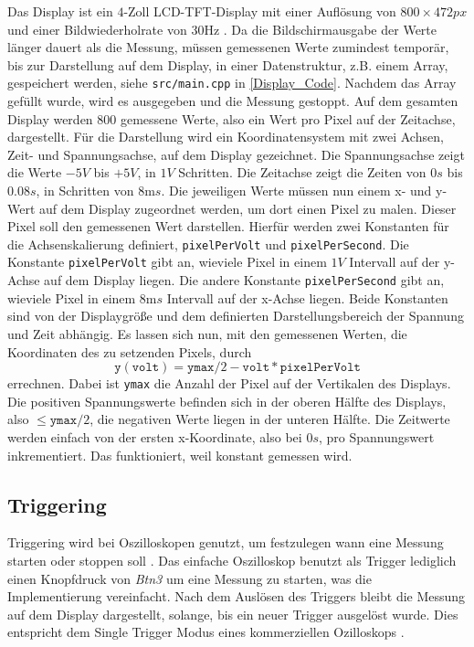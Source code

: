 Das Display ist ein $4$-Zoll LCD-TFT-Display mit einer Auflösung von \newline $800 \times 472 \si{px}$
und einer Bildwiederholrate von 30\si{\hertz} \cite{MikroControllerDatasheet_1}.
Da die Bildschirmausgabe der Werte länger dauert als die Messung, müssen gemessenen Werte
zumindest temporär, bis zur Darstellung auf dem Display, in einer Datenstruktur,
z.B. einem Array, gespeichert werden, siehe \texttt{src/main.cpp} in \ref{Display_Code}.
Nachdem das Array gefüllt wurde, wird es ausgegeben und die Messung gestoppt.
Auf dem gesamten Display werden 800 gemessene Werte, also ein Wert pro Pixel auf der Zeitachse,
dargestellt.
\newline \newline
Für die Darstellung wird ein Koordinatensystem mit zwei Achsen, Zeit- und Spannungsachse,
auf dem Display gezeichnet.
Die Spannungsachse zeigt die Werte $-5V$ bis $+5V$, in $1V$ Schritten.
Die Zeitachse zeigt die Zeiten von $0s$ bis $0.08s$, in Schritten von $8\si{\milli s}$.
Die jeweiligen Werte müssen nun einem x- und y-Wert auf dem Display zugeordnet werden,
um dort einen Pixel zu malen. Dieser Pixel soll den gemessenen Wert darstellen. \newline
Hierfür werden zwei Konstanten für die Achsenskalierung definiert,
\texttt{pixelPerVolt} und \texttt{pixelPerSecond}.
Die Konstante \texttt{pixelPerVolt} gibt an, wieviele Pixel in einem $1V$ Intervall auf der
y-Achse auf dem Display liegen.
Die andere Konstante \texttt{pixelPerSecond} gibt an, wieviele Pixel in einem $8\si{\milli s}$ Intervall
auf der x-Achse liegen. \newline
Beide Konstanten sind von der Displaygröße und dem definierten Darstellungsbereich der Spannung und
Zeit abhängig.
Es lassen sich nun, mit den gemessenen Werten, die Koordinaten des zu setzenden
Pixels, durch
$$
\texttt{y}(\texttt{volt}) = \texttt{ymax}/2 - \texttt{volt} * \texttt{pixelPerVolt}
$$
errechnen. Dabei ist \texttt{ymax} die Anzahl der Pixel auf der Vertikalen des Displays.
Die positiven Spannungswerte befinden sich in der oberen Hälfte des Displays, also $\le \texttt{ymax}/2$,
die negativen Werte liegen in der unteren Hälfte. \newline
Die Zeitwerte werden einfach von der ersten x-Koordinate, also bei $0s$, pro Spannungswert inkrementiert.
Das funktioniert, weil konstant gemessen wird.


\subsection{Triggering}

Triggering wird bei Oszilloskopen genutzt, um festzulegen wann eine Messung starten oder stoppen soll
\cite{Oscilloscope_Trigger}.
Das einfache Oszilloskop benutzt als Trigger lediglich einen Knopfdruck von \textit{Btn3}
um eine Messung zu starten, was die Implementierung vereinfacht.
Nach dem Auslösen des Triggers bleibt die Messung auf dem Display dargestellt, solange, bis ein neuer Trigger ausgelöst wurde.
Dies entspricht dem Single Trigger Modus eines kommerziellen Ozilloskops \cite{Oscilloscope_Trigger}.
